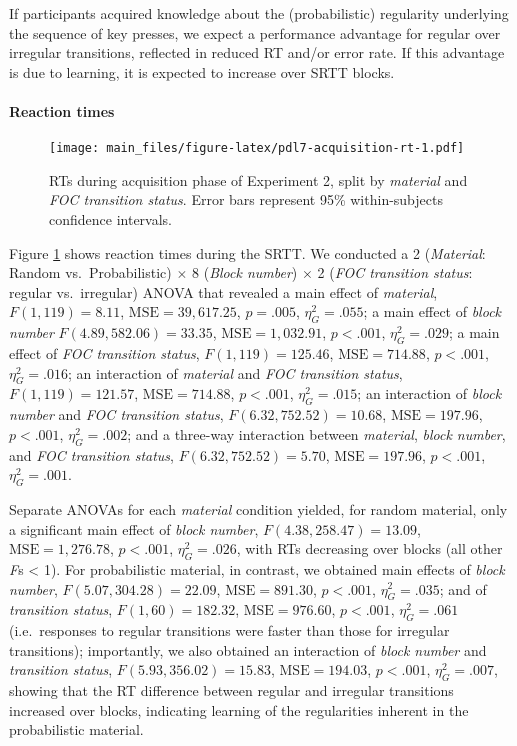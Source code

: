 \documentclass[jou]{apa6}
\theoremstyle{definition}
\theoremstyle{definition}
\theoremstyle{definition}
\theoremstyle{remark}
\begin{document}
If participants acquired knowledge about the (probabilistic) regularity
underlying the sequence of key presses, we expect a performance
advantage for regular over irregular transitions, reflected in reduced
RT and/or error rate. If this advantage is due to learning, it is
expected to increase over SRTT blocks.

\paragraph{Reaction times}\label{reaction-times-1}

\begin{figure}[htbp]
\centering
\texttt{[image: main\_files/figure-latex/pdl7-acquisition-rt-1.pdf]}
\caption{\label{fig:pdl7-acquisition-rt}RTs during acquisition phase of
Experiment 2, split by \emph{material} and \emph{FOC transition status}.
Error bars represent 95\% within-subjects confidence intervals.}
\end{figure}

Figure \ref{fig:pdl7-acquisition-rt} shows reaction times during the
SRTT. We conducted a 2 (\emph{Material}: Random vs.~Probabilistic)
\(\times\) 8 (\emph{Block number}) \(\times\) 2 (\emph{FOC transition
status}: regular vs.~irregular) ANOVA that revealed a main effect of
\emph{material}, \(F(1, 119) = 8.11\), \(\mathrm{MSE} = 39,617.25\),
\(p = .005\), \(\eta^2_G = .055\); a main effect of \emph{block number}
\(F(4.89, 582.06) = 33.35\), \(\mathrm{MSE} = 1,032.91\), \(p < .001\),
\(\eta^2_G = .029\); a main effect of \emph{FOC transition status},
\(F(1, 119) = 125.46\), \(\mathrm{MSE} = 714.88\), \(p < .001\),
\(\eta^2_G = .016\); an interaction of \emph{material} and \emph{FOC
transition status}, \(F(1, 119) = 121.57\), \(\mathrm{MSE} = 714.88\),
\(p < .001\), \(\eta^2_G = .015\); an interaction of \emph{block number}
and \emph{FOC transition status}, \(F(6.32, 752.52) = 10.68\),
\(\mathrm{MSE} = 197.96\), \(p < .001\), \(\eta^2_G = .002\); and a
three-way interaction between \emph{material}, \emph{block number}, and
\emph{FOC transition status}, \(F(6.32, 752.52) = 5.70\),
\(\mathrm{MSE} = 197.96\), \(p < .001\), \(\eta^2_G = .001\).

Separate ANOVAs for each \emph{material} condition yielded, for random
material, only a significant main effect of \emph{block number},
\(F(4.38, 258.47) = 13.09\), \(\mathrm{MSE} = 1,276.78\), \(p < .001\),
\(\eta^2_G = .026\), with RTs decreasing over blocks (all other
\emph{F}s \textless{} 1). For probabilistic material, in contrast, we
obtained main effects of \emph{block number},
\(F(5.07, 304.28) = 22.09\), \(\mathrm{MSE} = 891.30\), \(p < .001\),
\(\eta^2_G = .035\); and of \emph{transition status},
\(F(1, 60) = 182.32\), \(\mathrm{MSE} = 976.60\), \(p < .001\),
\(\eta^2_G = .061\) (i.e.~responses to regular transitions were faster
than those for irregular transitions); importantly, we also obtained an
interaction of \emph{block number} and \emph{transition status},
\(F(5.93, 356.02) = 15.83\), \(\mathrm{MSE} = 194.03\), \(p < .001\),
\(\eta^2_G = .007\), showing that the RT difference between regular and
irregular transitions increased over blocks, indicating learning of the
regularities inherent in the probabilistic material.
\end{document}

